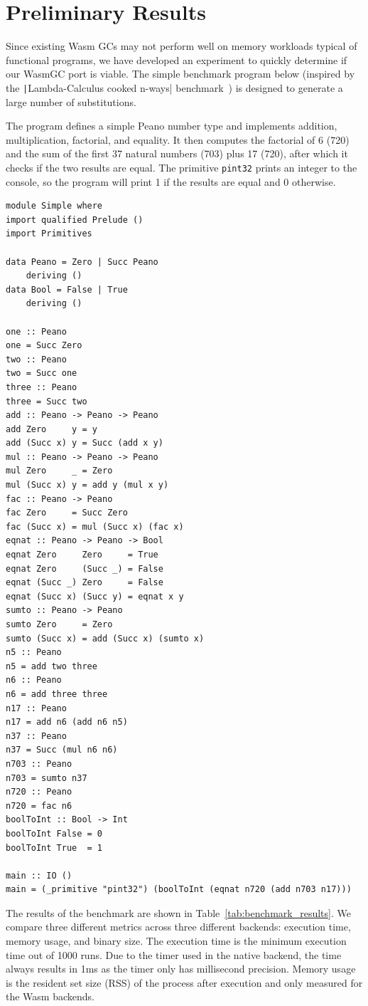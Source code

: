 \chapter{Preliminary Results}\label{ch:prelim}
Since existing Wasm GCs may not perform well on memory workloads typical of functional programs, we have developed an experiment to quickly determine if our WasmGC port is viable. The simple benchmark program below (inspired by the \texttt|Lambda-Calculus cooked n-ways| benchmark~\cite{lamb-n}) is designed to generate a large number of substitutions.

The program defines a simple Peano number type and implements addition, multiplication, factorial, and equality. It then computes the factorial of 6 (720) and the sum of the first 37 natural numbers (703) plus 17 (720), after which it checks if the two results are equal. The primitive \texttt{pint32} prints an integer to the console, so the program will print 1 if the results are equal and 0 otherwise.

\begin{verbatim}
module Simple where
import qualified Prelude ()
import Primitives

data Peano = Zero | Succ Peano
    deriving ()
data Bool = False | True
    deriving ()

one :: Peano
one = Succ Zero
two :: Peano
two = Succ one
three :: Peano
three = Succ two
add :: Peano -> Peano -> Peano
add Zero     y = y
add (Succ x) y = Succ (add x y)
mul :: Peano -> Peano -> Peano
mul Zero     _ = Zero
mul (Succ x) y = add y (mul x y)
fac :: Peano -> Peano
fac Zero     = Succ Zero
fac (Succ x) = mul (Succ x) (fac x)
eqnat :: Peano -> Peano -> Bool
eqnat Zero     Zero     = True
eqnat Zero     (Succ _) = False
eqnat (Succ _) Zero     = False
eqnat (Succ x) (Succ y) = eqnat x y
sumto :: Peano -> Peano
sumto Zero     = Zero
sumto (Succ x) = add (Succ x) (sumto x)
n5 :: Peano
n5 = add two three
n6 :: Peano
n6 = add three three
n17 :: Peano
n17 = add n6 (add n6 n5)
n37 :: Peano
n37 = Succ (mul n6 n6)
n703 :: Peano
n703 = sumto n37
n720 :: Peano
n720 = fac n6
boolToInt :: Bool -> Int
boolToInt False = 0
boolToInt True  = 1

main :: IO ()
main = (_primitive "pint32") (boolToInt (eqnat n720 (add n703 n17)))
\end{verbatim}

The results of the benchmark are shown in Table~\ref{tab:benchmark_results}. We compare three different metrics across three different backends: execution time, memory usage, and binary size. The execution time is the minimum execution time out of 1000 runs. Due to the timer used in the native backend, the time always results in 1ms as the timer only has millisecond precision. Memory usage is the resident set size (RSS) of the process after execution and only measured for the Wasm backends.

